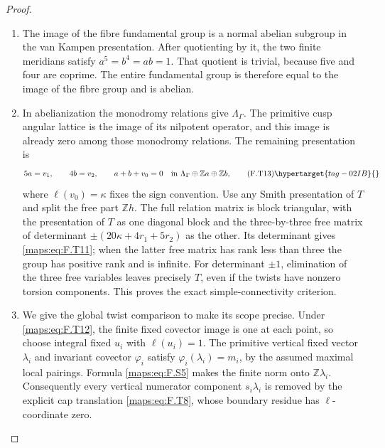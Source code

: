 \begin{proof}
\begin{enumerate}[label={$\langle1\rangle$\arabic*.}]
\item The image of the fibre fundamental group is a normal
abelian subgroup in the van Kampen presentation.
After quotienting by it, the two finite meridians satisfy
$a^5=b^4=ab=1$.
That quotient is trivial, because five and four are coprime.
The entire fundamental group is therefore equal to the
image of the fibre group and is abelian.

\item In abelianization the monodromy relations give
$\Lambda_\Gamma$.
The primitive cusp angular lattice is the image of its
nilpotent operator, and this image is already zero among
those monodromy relations.
The remaining presentation is
\[
 5a=v_1,\qquad4b=v_2,\qquad a+b+v_0=0
 \quad\text{in }\Lambda_\Gamma\oplus\mathbb Za\oplus\mathbb Zb,
 \tag{F.T13}\hypertarget{tag-02IB}{}\label{maps:eq:F.T13}
\]
where $\ell(v_0)=\kappa$ fixes the sign convention.
Use any Smith presentation of $T$ and split the free part
$\mathbb Zh$.
The full relation matrix is block triangular, with the
presentation of $T$ as one diagonal block and the
three-by-three free matrix of determinant
$\pm(20\kappa+4r_1+5r_2)$ as the other.
Its determinant gives \eqref{maps:eq:F.T11}; when the latter free
matrix has rank less than three the group has positive
rank and is infinite.
For determinant $\pm1$, elimination of the three free
variables leaves precisely $T$, even if the twists have
nonzero torsion components.
This proves the exact simple-connectivity criterion.

\item We give the global twist comparison to make its scope
precise.  Under \eqref{maps:eq:F.T12}, the finite fixed covector image
is one at each point, so choose integral fixed $u_i$ with
$\ell(u_i)=1$.  The primitive vertical fixed vector
$\lambda_i$ and invariant covector $\varphi_i$ satisfy
$\varphi_i(\lambda_i)=m_i$, by the assumed maximal local
pairings.  Formula \eqref{maps:eq:F.S5} makes the finite norm onto
$\mathbb Z\lambda_i$.
Consequently every vertical numerator component
$s_i\lambda_i$ is removed by the explicit cap translation
\eqref{maps:eq:F.T8}, whose boundary residue has $\ell$-coordinate zero.


\end{enumerate}
\end{proof}
